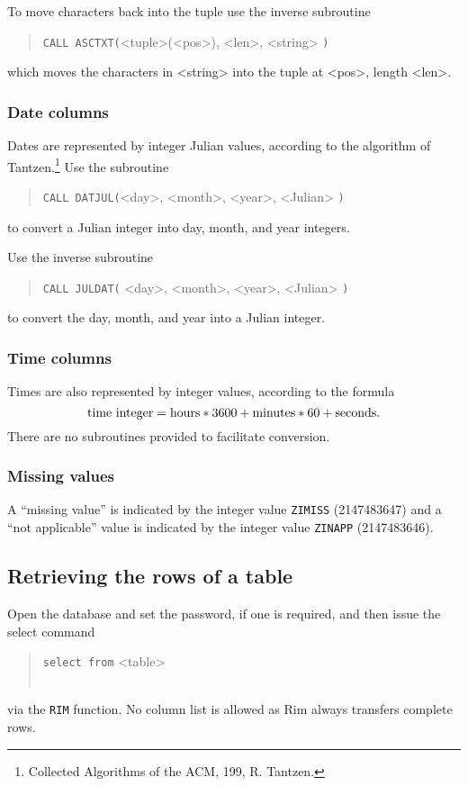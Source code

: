 \documentclass[11pt,a4paper]{report}
\begin{document}
To move characters back into the tuple use the inverse subroutine
\begin{verse}
  \verb!CALL ASCTXT(!<tuple>(<pos>), <len>, <string> \verb!)!
\end{verse}
which moves the characters in <string> into the tuple at <pos>,
length <len>.
 
 
\subsubsection{Date columns}
%
Dates are represented by integer Julian values,  according to
the algorithm of Tantzen.\footnote{Collected Algorithms of
the ACM, 199, R. Tantzen.}
Use the subroutine

\begin{verse}
  \verb!CALL DATJUL(!<day>, <month>, <year>, <Julian> \verb!)!
\end{verse}
to convert a Julian integer into day, month, and year integers.
 
Use the inverse subroutine
\begin{verse}
  \verb!CALL JULDAT(! <day>, <month>, <year>, <Julian> \verb!)!
\end{verse}
to convert the day, month, and year into a Julian integer.
 
\subsubsection{Time columns}
%
Times are also represented by integer values,  according to
the formula
$$\hbox{time integer} =
      \hbox{hours}*3600 + \hbox{minutes}*60 + \hbox{seconds}.$$
There are no subroutines provided to facilitate conversion.
 
\subsubsection{Missing values}
%
A ``missing value'' is indicated by the integer value
\verb!ZIMISS! (2147483647) and a ``not applicable'' value
is indicated by the integer value \verb!ZINAPP! (2147483646).
 
\subsection{Retrieving the rows of a table}
%
Open the database and set the password, if one is required, and then
issue the select command
\begin{verse}
  \verb!select from! <table> \\
    \qquad {} \\
    \qquad {}
\end{verse}
via the \verb!RIM! function.
No column list is allowed as Rim always transfers complete rows.
 
\end{document}
